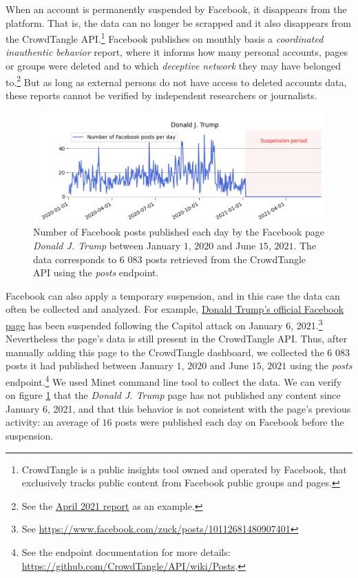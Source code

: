 \documentclass{article}
\begin{document}
When an account is permanently suspended by Facebook, it disappears from the platform. That is,  the data can no longer be scrapped and it also disappears from the CrowdTangle API.\footnote{CrowdTangle is a public insights tool owned and operated by Facebook, that exclusively tracks public content from Facebook public groups and pages.} Facebook publishes on monthly basis a {\it coordinated inauthentic behavior} report, where it informs how many personal accounts, pages or groups were deleted and to which {\it deceptive network} they may have belonged to.\footnote{See the \href{https://about.fb.com/news/2021/05/april-2021-coordinated-inauthentic-behavior-report/}{April 2021 report} as an example.} But as long as external persons do not have access to deleted accounts data, these reports cannot be verified by independent researchers or journalists.

\begin{figure}[h]
	\centering
			\includegraphics[scale=0.3]{./img/fb/fig1_fb.png}
	\caption{Number of Facebook posts published each day by the Facebook page {\it Donald J. Trump} between January $1$, $2020$ and June $15$, $2021$. The data corresponds to $6$ $083$ posts retrieved from the CrowdTangle API using the {\it posts} endpoint.}
	\label{fig1_fb}
\end{figure}

Facebook can also apply a temporary suspension, and in this case the data can often be collected and analyzed. For example, \href{https://www.facebook.com/DonaldTrump/}{Donald Trump’s official Facebook page}  has been suspended following the Capitol attack on January 6, 2021.\footnote{See \href{https://www.facebook.com/zuck/posts/10112681480907401}{https://www.facebook.com/zuck/posts/10112681480907401}} Nevertheless the page’s data is still present in the CrowdTangle API. Thus, after manually adding this page to the CrowdTangle dashboard, we collected the $6$ $083$ posts it had published between January $1$, $2020$ and June $15$, $2021$ using the {\it posts} endpoint.\footnote{See the endpoint documentation for more details: \href{https://github.com/CrowdTangle/API/wiki/Posts}{https://github.com/CrowdTangle/API/wiki/Posts}.} We used Minet command line tool \cite{minet} to collect the data. We can verify on figure \ref{fig1_fb} that the {\it Donald J. Trump} page has not published any content since January $6$, 2021, and that this behavior is not consistent with the page’s previous activity: an average of $16$ posts were published each day on Facebook before the suspension. 
\end{document}

